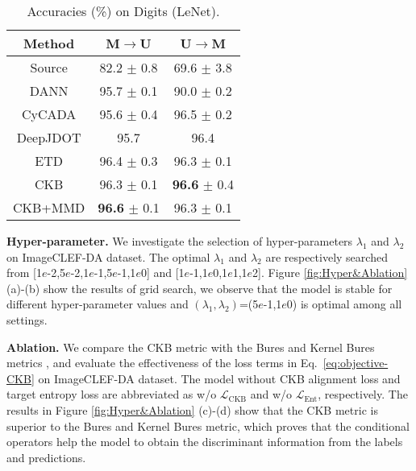 \documentclass[final]{cvpr}
\newcommand{\MC}{\mathcal}
\begin{document}
\begin{table}
\centering
\caption{Accuracies (\%) on Digits (LeNet).}
\label{tab:Digits}
	\begin{tabular}{c|cc}
      \toprule[1pt]
	  Method & M$\to$U & U$\to$M \\
      \hline
      Source \cite{hoffman2018cycada} & 82.2 $\pm$ 0.8 & 69.6 $\pm$ 3.8 \\
      DANN \cite{ganin2016domain} & 95.7 $\pm$ 0.1 & 90.0 $\pm$ 0.2 \\
      CyCADA \cite{hoffman2018cycada} & 95.6 $\pm$ 0.4 & 96.5 $\pm$ 0.2 \\
      DeepJDOT \cite{bhushan2018deepjdot} & 95.7 & 96.4 \\
      ETD \cite{li2020Enhanced} & 96.4 $\pm$ 0.3 & 96.3 $\pm$ 0.1 \\
      \hline
      CKB & 96.3 $\pm$ 0.1 & \textbf{96.6} $\pm$ 0.4 \\
      CKB+MMD & \textbf{96.6} $\pm$ 0.1 & 96.3 $\pm$ 0.1 \\
      \bottomrule[1pt]
	\end{tabular}
\vspace{-4pt}
\end{table}

\textbf{Hyper-parameter.} We investigate the selection of hyper-parameters $\lambda_1$ and $\lambda_2$ on ImageCLEF-DA dataset. The optimal $\lambda_1$ and $\lambda_2$ are respectively searched from [1$e$-2,5$e$-2,1$e$-1,5$e$-1,1$e$0] and [1$e$-1,1$e$0,1$e$1,1$e$2]. Figure \ref{fig:Hyper&Ablation} (a)-(b) show the results of grid search, we observe that the model is stable for different hyper-parameter values and $(\lambda_1,\lambda_2)$=(5$e$-1,1$e$0) is optimal among all settings.

\textbf{Ablation.} We compare the CKB metric with the Bures and Kernel Bures metrics \cite{zhang2019optimal}, and evaluate the effectiveness of the loss terms in Eq.~\eqref{eq:objective-CKB} on ImageCLEF-DA dataset. The model without CKB alignment loss and target entropy loss are abbreviated as w/o $\MC{L}_{\text{CKB}}$ and w/o $\MC{L}_{\text{Ent}}$, respectively. The results in Figure \ref{fig:Hyper&Ablation} (c)-(d) show that the CKB metric is superior to the Bures and Kernel Bures metric, which proves that the conditional operators help the model to obtain the discriminant information from the labels and predictions.
\end{document}
